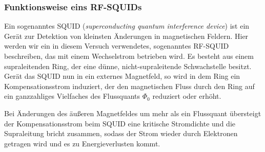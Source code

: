 \documentclass[a4paper,ngerman]{scrartcl}
\begin{document}





\FloatBarrier
\subsubsection{Funktionsweise eins RF-SQUIDs}
Ein sogenanntes SQUID (\emph{superconducting quantum interference device}) 
ist ein Gerät zur Detektion von kleinsten Änderungen in
magnetischen Feldern. 
Hier werden wir ein  in diesem Versuch verwendetes, sogenanntes RF-SQUID beschreiben, 
das mit einem Wechselstrom betrieben wird.
Es besteht aus einem supraleitenden Ring, der eine dünne, nicht-supraleitende Schwachstelle besitzt. 
Gerät das SQUID nun in ein externes Magnetfeld,
so wird in dem Ring ein Kompensationsstrom induziert,
der den magnetischen Fluss durch den Ring auf ein ganzzahliges 
Vielfaches des Flussquants $\Phi_0$ reduziert oder erhöht.

Bei Änderungen des äußeren Magnetfeldes um mehr als ein Flussquant übersteigt der Kompensationsstrom beim SQUID eine kritische Stromdichte und die Supraleitung bricht zusammen, 
sodass der Strom wieder durch Elektronen getragen wird und es zu 
Energieverlusten kommt.
\end{document}
